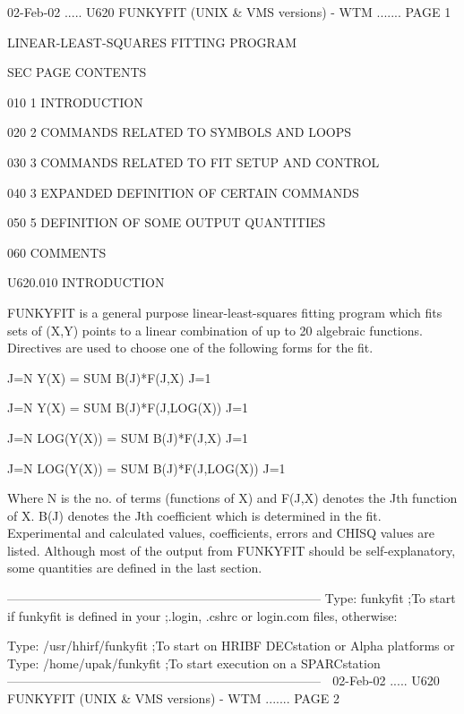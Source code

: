    02-Feb-02 ..... U620  FUNKYFIT (UNIX & VMS versions) - WTM ....... PAGE   1
 
                      LINEAR-LEAST-SQUARES FITTING PROGRAM
 
   SEC PAGE CONTENTS
 
   010   1  INTRODUCTION
 
   020   2  COMMANDS RELATED TO SYMBOLS AND LOOPS
 
   030   3  COMMANDS RELATED TO FIT SETUP AND CONTROL
 
   040   3  EXPANDED DEFINITION OF CERTAIN COMMANDS
 
   050   5  DEFINITION OF SOME OUTPUT QUANTITIES
 
   060  COMMENTS
 
   U620.010  INTRODUCTION
 
   FUNKYFIT  is  a  general purpose linear-least-squares fitting program which
   fits sets of (X,Y) points to a linear combination of  up  to  20  algebraic
   functions. Directives are used to choose one of the following forms for the
   fit.
 
                  J=N
         Y(X) = SUM   B(J)*F(J,X)
                  J=1
 
                  J=N
         Y(X) = SUM   B(J)*F(J,LOG(X))
                  J=1
 
                       J=N
         LOG(Y(X)) = SUM   B(J)*F(J,X)
                       J=1
 
                       J=N
         LOG(Y(X)) = SUM   B(J)*F(J,LOG(X))
                       J=1
 
   Where  N  is  the  no. of terms (functions of X) and F(J,X) denotes the Jth
   function of X. B(J) denotes the Jth coefficient which is determined in  the
   fit.  Experimental  and  calculated  values, coefficients, errors and CHISQ
   values are listed. Although most of the  output  from  FUNKYFIT  should  be
   self-explanatory, some quantities are defined in the last section.
 
   ---------------------------------------------------------------------------
   Type:  funkyfit            ;To start if funkyfit is defined in your
                              ;.login, .cshrc or login.com files, otherwise:
 
   Type:  /usr/hhirf/funkyfit ;To start on HRIBF DECstation or Alpha platforms
   or
   Type:  /home/upak/funkyfit ;To start execution on a SPARCstation
   ---------------------------------------------------------------------------
    
   02-Feb-02 ..... U620  FUNKYFIT (UNIX & VMS versions) - WTM ....... PAGE   2
 
